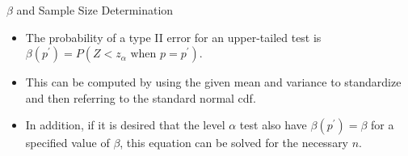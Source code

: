 \documentclass[
  ignorenonframetext,
]{beamer}
\providecommand{\tightlist}{%
  \setlength{\itemsep}{0pt}\setlength{\parskip}{0pt}}\usepackage{longtable,booktabs,array}
\begin{document}
\begin{frame}{\(\beta\) and Sample Size Determination}
\protect\hypertarget{beta-and-sample-size-determination-5}{}
\begin{itemize}[<+->]
\tightlist
\item
  The probability of a type II error for an upper-tailed test is
  \(\beta(p^{\prime}) = P(Z < z_{\alpha} \text{ when } p = p^{\prime})\).
\item
  This can be computed by using the given mean and variance to
  standardize and then referring to the standard normal cdf.
\item
  In addition, if it is desired that the level \(\alpha\) test also have
  \(\beta(p^{\prime}) = \beta\) for a specified value of \(\beta\), this
  equation can be solved for the necessary \(n\).
\end{itemize}
\end{frame}
\end{document}
